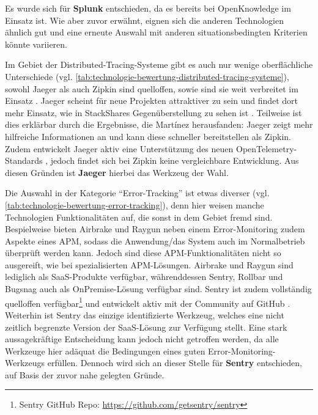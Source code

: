 Es wurde sich für \textbf{Splunk} entschieden, da es bereits bei OpenKnowledge im Einsatz ist. Wie aber zuvor erwähnt, eignen sich die anderen Technologien ähnlich gut und eine erneute Auswahl mit anderen situationsbedingten Kriterien könnte variieren.



Im Gebiet der Distributed-Tracing-Systeme gibt es auch nur wenige oberflächliche Unterschiede (vgl. \autoref{tab:technologie-bewertung-distributed-tracing-systeme}), sowohl Jaeger als auch Zipkin sind quelloffen, sowie sind sie weit verbreitet im Einsatz \cite{AnalysisOfDistributedTracingSystemsEffectOnPerformance}. Jaeger scheint für neue Projekten attraktiver zu sein und findet dort mehr Einsatz, wie in StackShares Gegenüberstellung zu sehen ist \cite{StackShareJaegerVsZipkin}. Teilweise ist dies erklärbar durch die Ergebnisse, die Mart{\'i}nez \etal \cite{ComparisonOfE2ETestingToolsForMicroservices} herausfanden: Jaeger zeigt mehr hilfreiche Informationen an und kann diese schneller bereitstellen als Zipkin. Zudem entwickelt Jaeger aktiv eine Unterstützung des neuen OpenTelemetry-Standards \cite{JaegerOpenTelemetry}, jedoch findet sich bei Zipkin keine vergleichbare Entwicklung. Aus diesen Gründen ist \textbf{Jaeger} hierbei das Werkzeug der Wahl.



Die Auswahl in der Kategorie \enquote{Error-Tracking} ist etwas diverser (vgl. \autoref{tab:technologie-bewertung-error-tracking}), denn hier weisen manche Technologien Funktionalitäten auf, die sonst in dem Gebiet fremd sind. Bespielweise bieten Airbrake und Raygun neben einem Error-Monitoring zudem Aspekte eines APM, sodass die Anwendung/das System auch im Normalbetrieb überprüft werden kann. Jedoch sind diese APM-Funktionalitäten nicht so ausgereift, wie bei spezialisierten APM-Lösungen. Airbrake und Raygun sind lediglich als SaaS-Produkte verfügbar, währenddessen Sentry, Rollbar und Bugsnag auch als OnPremise-Lösung verfügbar sind. Sentry ist zudem vollständig quelloffen verfügbar\footnote{Sentry GitHub Repo: \url{https://github.com/getsentry/sentry}} und entwickelt aktiv mit der Community auf GitHub \cite{GitHub}. Weiterhin ist Sentry das einzige identifizierte Werkzeug, welches eine nicht zeitlich begrenzte Version der SaaS-Lösung zur Verfügung stellt. Eine stark aussagekräftige Entscheidung kann jedoch nicht getroffen werden, da alle Werkzeuge hier adäquat die Bedingungen eines guten Error-Monitoring-Werkzeugs erfüllen. Dennoch wird sich an dieser Stelle für \textbf{Sentry} entschieden, auf Basis der zuvor nahe gelegten Gründe.

